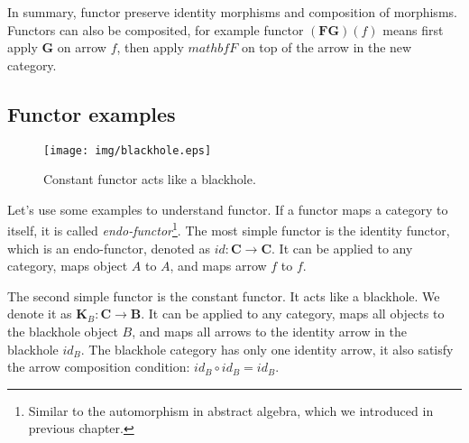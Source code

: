 \documentclass{article}
\begin{document}
In summary, functor preserve identity morphisms and composition of morphisms. Functors can also be composited, for example functor $(\mathbf{F} \mathbf{G})(f)$ means first apply $\mathbf{G}$ on arrow $f$, then apply $mathbf{F}$ on top of the arrow in the new category.

\subsection{Functor examples}
\label{sec:functor:examples}

\begin{wrapfigure}{R}{0.3\textwidth}
 \centering
 \texttt{[image: img/blackhole.eps]}
 \captionsetup{labelformat=empty}
 \caption{Constant functor acts like a blackhole.}
 \label{fig:blackhole}
\end{wrapfigure}

 
Let's use some examples to understand functor. If a functor maps a category to itself, it is called {\em endo-functor}\footnote{Similar to the automorphism in abstract algebra, which we introduced in previous chapter.}. The most simple functor is the identity functor, which is an endo-functor, denoted as $id: \pmb{C} \to \pmb{C}$. It can be applied to any category, maps object $A$ to $A$, and maps arrow $f$ to $f$.

The second simple functor is the constant functor. It acts like a blackhole. We denote it as $\mathbf{K}_B : \pmb{C} \to \pmb{B}$. It can be applied to any category, maps all objects to the blackhole object $B$, and maps all arrows to the identity arrow in the blackhole $id_B$. The blackhole category has only one identity arrow, it also satisfy the arrow composition condition: $id_B \circ id_B = id_B$.
\end{document}
